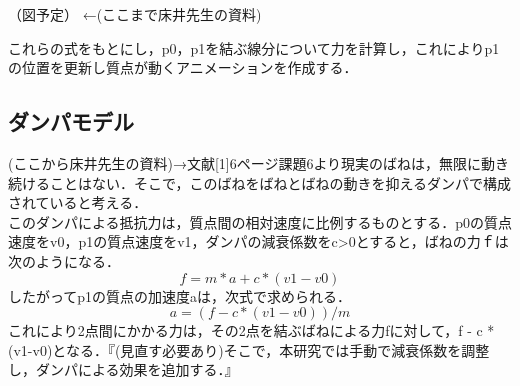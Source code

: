 \documentclass[11pt]{jreport}
\begin{document}
（図予定）
←(ここまで床井先生の資料)

 これらの式をもとにし，p0，p1を結ぶ線分について力を計算し，これによりp1の位置を更新し質点が動くアニメーションを作成する．

\subsection{ダンパモデル}
  (ここから床井先生の資料)→文献[1]6ページ課題6より現実のばねは，無限に動き続けることはない．そこで，このばねをばねとばねの動きを抑えるダンパで構成されていると考える．\\
 このダンパによる抵抗力は，質点間の相対速度に比例するものとする．p0の質点速度をv0，p1の質点速度をv1，ダンパの減衰係数をc>0とすると，ばねの力ｆは次のようになる．
\begin{equation}
  f = m * a + c * (v1-v0) \label{exp:sample}
\end{equation}
したがってp1の質点の加速度aは，次式で求められる．
\begin{equation}
  a = (f - c * (v1-v0)) / m \label{exp:sample}
\end{equation}
これにより2点間にかかる力は，その2点を結ぶばねによる力fに対して，f - c * (v1-v0)となる．『(見直す必要あり)そこで，本研究では手動で減衰係数を調整し，ダンパによる効果を追加する．』
\end{document}
